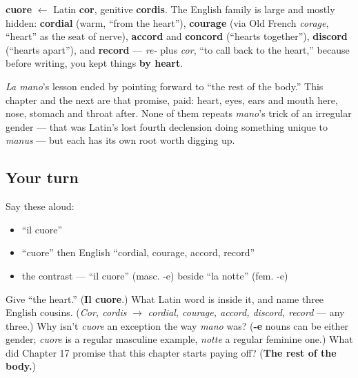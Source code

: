 \begin{cousinweb}
\textbf{cuore} $\leftarrow$ Latin \textbf{cor}, genitive \textbf{cordis}. The English family is large and mostly hidden: \textbf{cordial} (warm, \textquotedblleft{}from the heart\textquotedblright{}), \textbf{courage} (via Old French \emph{corage}, \textquotedblleft{}heart\textquotedblright{} as the seat of nerve), \textbf{accord} and \textbf{concord} (\textquotedblleft{}hearts together\textquotedblright{}), \textbf{discord} (\textquotedblleft{}hearts apart\textquotedblright{}), and \textbf{record} — \emph{re-} plus \emph{cor}, \textquotedblleft{}to call back to the heart,\textquotedblright{} because before writing, you kept things \textbf{by heart}.

\emph{La mano}'s lesson ended by pointing forward to \textquotedblleft{}the rest of the body.\textquotedblright{} This chapter and the next are that promise, paid: heart, eyes, ears and mouth here, nose, stomach and throat after. None of them repeats \emph{mano}'s trick of an irregular gender — that was Latin's lost fourth declension doing something unique to \emph{manus} — but each has its own root worth digging up.
\end{cousinweb}

\subsection*{Your turn}
Say these aloud:

\begin{itemize}
\raggedright
  \item \textquotedblleft{}il cuore\textquotedblright{}
  \item \textquotedblleft{}cuore\textquotedblright{} then English \textquotedblleft{}cordial, courage, accord, record\textquotedblright{}
  \item the contrast — \textquotedblleft{}il cuore\textquotedblright{} (masc. -e) beside \textquotedblleft{}la notte\textquotedblright{} (fem. -e)
\end{itemize}

\begin{tcolorbox}[breakable,colback=teal!4,colframe=teal!35!black,title={Before you move on}]
Give \textquotedblleft{}the heart.\textquotedblright{} (\textbf{Il cuore}.) What Latin word is inside it, and name three English cousins. (\emph{Cor, cordis} $\to$ \emph{cordial, courage, accord, discord, record} — any three.) Why isn't \emph{cuore} an exception the way \emph{mano} was? (\textbf{-e} nouns can be either gender; \emph{cuore} is a regular masculine example, \emph{notte} a regular feminine one.) What did Chapter 17 promise that this chapter starts paying off? (\textbf{The rest of the body.})
\end{tcolorbox}
